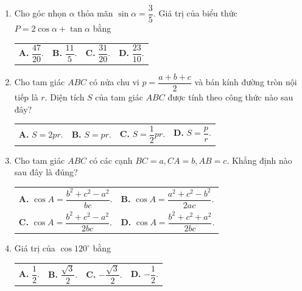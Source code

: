 \documentclass[12pt,a4paper]{article}
\makeatletter
\newcommand{\four}[4]{\par\noindent\begin{tabularx}{\linewidth}{@{}*{4}{>{\raggedright\arraybackslash}X}@{}}\textbf{A.} #1&\textbf{B.} #2&\textbf{C.} #3&\textbf{D.} #4\end{tabularx}}
\newcommand{\two}[4]{\par\noindent\begin{tabularx}{\linewidth}{@{}*{2}{>{\raggedright\arraybackslash}X}@{}}\textbf{A.} #1&\textbf{B.} #2\\[2pt]\textbf{C.} #3&\textbf{D.} #4\end{tabularx}}
\makeatother
\begin{document}
\begin{enumerate}
\item Cho góc nhọn $\alpha$ thỏa mãn $\sin\alpha = \dfrac{3}{5}$. Giá trị của biểu thức $P = 2\cos\alpha + \tan\alpha$ bằng
\four{$\dfrac{47}{20}$.}{$\dfrac{11}{5}$.}{$\dfrac{31}{20}$.}{$\dfrac{23}{10}$.}

\item Cho tam giác $ABC$ có nửa chu vi $p = \dfrac{a+b+c}{2}$ và bán kính đường tròn nội tiếp là $r$. Diện tích $S$ của tam giác $ABC$ được tính theo công thức nào sau đây?
\four{$S = 2pr$.}{$S = pr$.}{$S = \dfrac{1}{2}pr$.}{$S = \dfrac{p}{r}$.}

\item Cho tam giác $ABC$ có các cạnh $BC = a, CA = b, AB = c$. Khẳng định nào sau đây là đúng?
\two{$\cos A = \dfrac{b^2 + c^2 - a^2}{bc}$.}{$\cos A = \dfrac{a^2 + c^2 - b^2}{2ac}$.}{$\cos A = \dfrac{b^2 + c^2 - a^2}{2bc}$.}{$\cos A = \dfrac{b^2 + c^2 + a^2}{2bc}$.}

\item Giá trị của $\cos 120^\circ$ bằng
\four{$\dfrac{1}{2}$.}{$\dfrac{\sqrt{3}}{2}$.}{$-\dfrac{\sqrt{3}}{2}$.}{$-\dfrac{1}{2}$.}
\end{enumerate}
\end{document}
